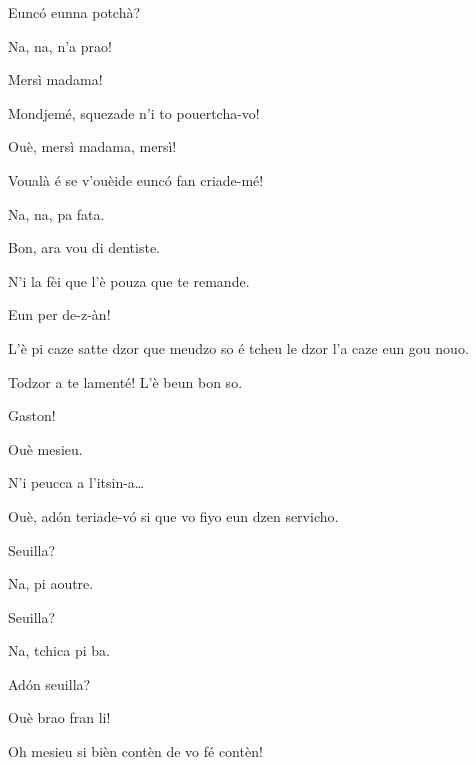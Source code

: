 \begin{drama}
\Fernandaspeaks  Eunc\'o eunna potchà?

\Gerominespeaks  Na, na, n'a prao!


\Fernandaspeaks{} Mersì madama!


\Fernandaspeaks Mondjemé, squezade n'i to pouertcha-vo!

\Gerominespeaks{} Ouè, mersì madama, mersì!

\Fernandaspeaks Voualà é se v'ouèide eunc\'o fan criade-mé!

\Gerominespeaks Na, na, pa fata.

\Fernandaspeaks Bon, ara vou di dentiste.

\Casimirspeaks N'i la fèi que l'è pouza que te remande.

\Fernandaspeaks  Eun per de-z-àn!


\Gerominespeaks L’è pi caze satte dzor que meudzo so é tcheu le dzor l’a caze eun gou nouo.

\Casimirspeaks Todzor a te lamenté! L'è beun bon so.

\PersEmpourtantaspeaks {} Gaston!

\Eunfeurmispeaks Ouè mesieu.

\PersEmpourtantaspeaks N’i peucca a l’itsin-a\ldots

\Eunfeurmispeaks Ouè, ad\'on teriade-v\'o si que vo fiyo eun dzen servicho.


\Eunfeurmispeaks Seuilla?

\PersEmpourtantaspeaks Na, pi aoutre.

\Eunfeurmispeaks Seuilla?

\PersEmpourtantaspeaks Na, tchica pi ba.

\Eunfeurmispeaks Ad\'on seuilla?

\PersEmpourtantaspeaks Ouè brao fran li!

\Eunfeurmispeaks Oh mesieu si bièn contèn de vo fé contèn!


\end{drama}
